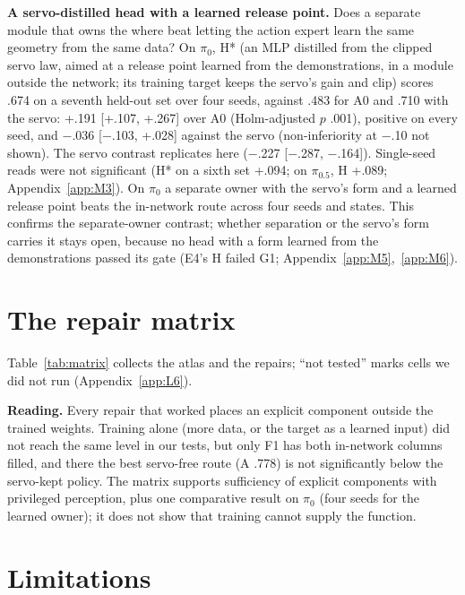 \documentclass{article}
\newcommand{\mi}{$-$}
\newcommand{\pifive}{$\pi_{0.5}$}
\newcommand{\pizero}{$\pi_0$}
\begin{document}
\textbf{A servo-distilled head with a learned release point.} Does a separate module that owns the where beat letting the action expert learn the same geometry from the same data? On \pizero{}, H* (an MLP distilled from the clipped servo law, aimed at a release point learned from the demonstrations, in a module outside the network; its training target keeps the servo's gain and clip) scores .674 on a seventh held-out set over four seeds, against .483 for A0 and .710 with the servo: +.191 [+.107, +.267] over A0 (Holm-adjusted $p$ .001), positive on every seed, and \mi.036 [\mi.103, +.028] against the servo (non-inferiority at \mi.10 not shown). The servo contrast replicates here (\mi.227 [\mi.287, \mi.164]). Single-seed reads were not significant (H* on a sixth set +.094; on \pifive{}, H +.089; Appendix~\ref{app:M3}). On \pizero{} a separate owner with the servo's form and a learned release point beats the in-network route across four seeds and states. This confirms the separate-owner contrast; whether separation or the servo's form carries it stays open, because no head with a form learned from the demonstrations passed its gate (E4's H failed G1; Appendix~\ref{app:M5},~\ref{app:M6}).




\section{The repair matrix}
\label{sec:matrix}

Table~\ref{tab:matrix} collects the atlas and the repairs; ``not tested'' marks cells we did not run (Appendix~\ref{app:L6}).

\textbf{Reading.} Every repair that worked places an explicit component outside the trained weights. Training alone (more data, or the target as a learned input) did not reach the same level in our tests, but only F1 has both in-network columns filled, and there the best servo-free route (A .778) is not significantly below the servo-kept policy. The matrix supports sufficiency of explicit components with privileged perception, plus one comparative result on \pizero{} (four seeds for the learned owner); it does not show that training cannot supply the function.

\section{Limitations}
\label{sec:limits}
\end{document}
